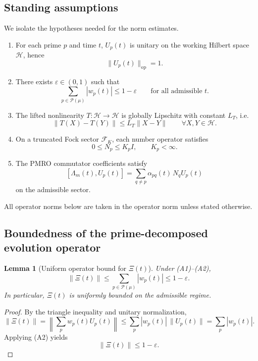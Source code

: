 \documentclass[12pt]{amsart}
\theoremstyle{plain}
\newtheorem{lemma}[theorem]{Lemma}
\begin{document}
\subsection{Standing assumptions}

We isolate the hypotheses needed for the norm estimates.

\begin{enumerate}
\item[(A1)] For each prime \(p\) and time \(t\), \(U_p(t)\) is unitary on the working Hilbert space \(\mathcal H\), hence
\[
\|U_p(t)\|_{\mathrm{op}}=1.
\]

\item[(A2)] There exists \(\varepsilon\in(0,1)\) such that
\[
\sum_{p\in \mathcal P(\mu)} |w_p(t)| \le 1-\varepsilon
\qquad
\text{for all admissible } t.
\]

\item[(A3)] The lifted nonlinearity \(T:\mathcal H\to\mathcal H\) is globally Lipschitz with constant \(L_T\), i.e.
\[
\|T(X)-T(Y)\|\le L_T\|X-Y\|
\qquad
\forall X,Y\in\mathcal H.
\]

\item[(A4)] On a truncated Fock sector \(\mathcal F_K\), each number operator satisfies
\[
0\le N_p \le K_p I,
\qquad
K_p<\infty.
\]

\item[(A5)] The PMRO commutator coefficients satisfy
\[
[\Lambda_m(t),U_p(t)] = \sum_{q\ne p} \alpha_{pq}(t)\,N_q U_p(t)
\]
on the admissible sector.
\end{enumerate}

All operator norms below are taken in the operator norm unless stated otherwise.

\subsection{Boundedness of the prime-decomposed evolution operator}

\begin{lemma}[Uniform operator bound for \(\Xi(t)\)]
\label{lem:Xi_bound}
Under \textup{(A1)}--\textup{(A2)},
\[
\|\Xi(t)\|
\le
\sum_{p\in\mathcal P(\mu)} |w_p(t)|
\le
1-\varepsilon.
\]
In particular, \(\Xi(t)\) is uniformly bounded on the admissible regime.
\end{lemma}

\begin{proof}
By the triangle inequality and unitary normalization,
\[
\|\Xi(t)\|
=
\left\|
\sum_{p} w_p(t)U_p(t)
\right\|
\le
\sum_p |w_p(t)|\,\|U_p(t)\|
=
\sum_p |w_p(t)|.
\]
Applying \textup{(A2)} yields
\[
\|\Xi(t)\|\le 1-\varepsilon.
\]
\end{proof}
\end{document}
